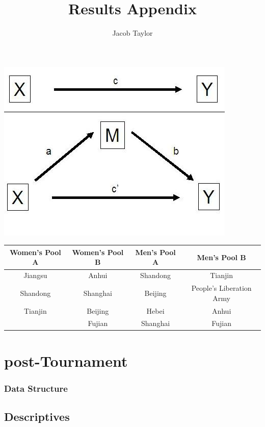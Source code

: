 \documentclass[12pt]{report}
\title{Results Appendix}
\author{Jacob Taylor}
\begin{document}
\includegraphics[scale =.4]{../images/mediation_image.jpg}


\begin{center}
\begin{tabular}{ c c c c }
Women's Pool A & Women's Pool B & Men's Pool A & Men's Pool B \\
\hline
Jiangsu & Anhui & Shandong & Tianjin \\
Shandong & Shanghai & Beijing & People's Liberation Army \\
Tianjin & Beijing & Hebei & Anhui \\
   & Fujian & Shanghai & Fujian \\
\end{tabular}
\end{center}




\section{post-Tournament}




\subsubsection{Data Structure}





\subsection{Descriptives}

\clearpage






\end{document}
